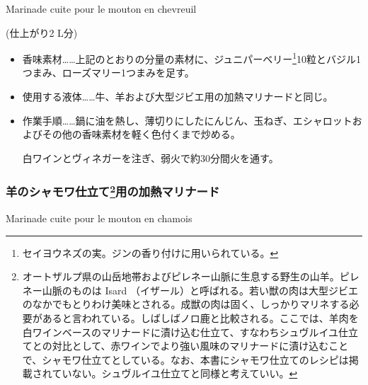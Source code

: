 \begin{recette}
\begin{frsubenv}

Marinade cuite pour le mouton en chevreuil

\end{frsubenv}


(仕上がり2 L分)

\begin{itemize}
\item
  香味素材\ldots{}\ldots{}上記のとおりの分量の素材に、ジュニパーベリー\footnote{セイヨウネズの実。ジンの香り付けに用いられている。}10粒とバジル1つまみ、ローズマリー1つまみを足す。
\item
  使用する液体\ldots{}\ldots{}牛、羊および大型ジビエ用の加熱マリナードと同じ。
\item
  作業手順\ldots{}\ldots{}鍋に油を熱し、薄切りにしたにんじん、玉ねぎ、エシャロットおよびその他の香味素材を軽く色付くまで炒める。

  白ワインとヴィネガーを注ぎ、弱火で約30分間火を通す。
\end{itemize}

\atoaki{}

\hypertarget{marinade-cuite-pour-le-mouton-en-chamois}{%
\subsubsection[羊のシャモワ仕立て用の加熱マリナード]{\texorpdfstring{羊のシャモワ仕立て\footnote{オートザルプ県の山岳地帯およびピレネー山脈に生息する野生の山羊。ピレネー山脈のものは
  Isard
  （イザール）と呼ばれる。若い獣の肉は大型ジビエのなかでもとりわけ美味とされる。成獣の肉は固く、しっかりマリネする必要があると言われている。しばしばノロ鹿と比較される。ここでは、羊肉を白ワインベースのマリナードに漬け込む仕立て、すなわちシュヴルイユ仕立てとの対比として、赤ワインでより強い風味のマリナードに漬け込むことで、シャモワ仕立てとしている。なお、本書にシャモワ仕立てのレシピは掲載されていない。シュヴルイユ仕立てと同様と考えていい。}用の加熱マリナード}{羊のシャモワ仕立て用の加熱マリナード}}\label{marinade-cuite-pour-le-mouton-en-chamois}}

\begin{frsubenv}

Marinade cuite pour le mouton en chamois

\end{frsubenv}


\end{recette}
